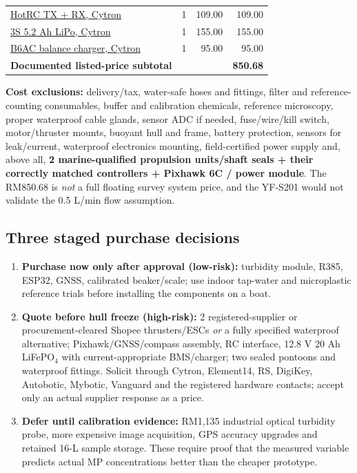 \documentclass[10pt,a4paper]{article}
\begin{document}
\begin{table}[H]
\begin{tabularx}{\linewidth}{@{}Y r r r@{}}
\href{https://my.cytron.io/p-hotrc-6-channels-rc-radio-transmitter-and-receiver}{HotRC TX + RX, Cytron} & 1 & 109.00 & 109.00\\
\href{https://my.cytron.io/p-lipo-rechargeable-battery-11.1v-5200mah}{3S 5.2 Ah LiPo, Cytron} & 1 & 155.00 & 155.00\\
\href{https://my.cytron.io/p-multi-function-lipo-balance-charger-13853}{B6AC balance charger, Cytron} & 1 & 95.00 & 95.00\\\midrule
\textbf{Documented listed-price subtotal} & & & \textbf{850.68}\\
\bottomrule\end{tabularx}\end{table}
\textbf{Cost exclusions:} delivery/tax, water-safe hoses and fittings, filter and reference-counting consumables, buffer and calibration chemicals, reference microscopy, proper waterproof cable glands, sensor ADC if needed, fuse/wire/kill switch, motor/thruster mounts, buoyant hull and frame, battery protection, sensors for leak/current, waterproof electronics mounting, field-certified power supply and, above all, \textbf{2 marine-qualified propulsion units/shaft seals + their correctly matched controllers + Pixhawk 6C / power module}. The RM850.68 is \emph{not} a full floating survey system price, and the YF-S201 would not validate the 0.5 L/min flow assumption.

\subsection{Three staged purchase decisions}
\begin{enumerate}[leftmargin=*]
\item \textbf{Purchase now only after approval (low-risk):} turbidity module, R385, ESP32, GNSS, calibrated beaker/scale; use indoor tap-water and microplastic reference trials before installing the components on a boat.
\item \textbf{Quote before hull freeze (high-risk):} 2 registered-supplier or procurement-cleared Shopee thrusters/ESCs \emph{or} a fully specified waterproof alternative; Pixhawk/GNSS/compass assembly, RC interface, 12.8 V 20 Ah LiFePO$_4$ with current-appropriate BMS/charger; two sealed pontoons and waterproof fittings. Solicit through Cytron, Element14, RS, DigiKey, Autobotic, Mybotic, Vanguard and the registered hardware contacts; accept only an actual supplier response as a price.
\item \textbf{Defer until calibration evidence:} RM1,135 industrial optical turbidity probe, more expensive image acquisition, GPS accuracy upgrades and retained 16-L sample storage. These require proof that the measured variable predicts actual MP concentrations better than the cheaper prototype.
\end{enumerate}
\end{document}
